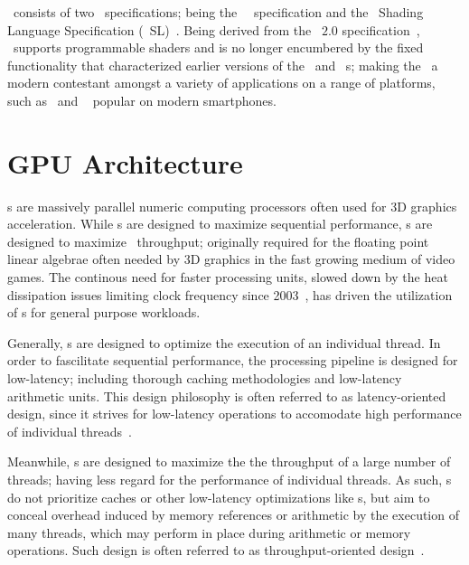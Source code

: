 \dvttermopenglestwopointo\ consists of two \dvttermkhronos\ specifications; being the \dvttermopenglestwopointo\ \dvttermapi\ specification and the \dvttermopengles\ Shading Language Specification (\dvttermopengles\ SL)~.
Being derived from the \dvttermopengl ~$2.0$ specification~, \dvttermopenglestwopointo\ supports programmable shaders and is no longer encumbered by the fixed functionality that characterized earlier versions of the \dvttermopengl\ and \dvttermopengles\ \dvttermapi s; making the \dvttermapi\ a modern contestant amongst a variety of applications on a range of platforms, such as \dvttermandroid\ and \dvttermios ~ popular on modern smartphones.

\section{GPU Architecture}
\label{sec:backgroundandrelatedwork_gpuarchitecture}
\dvttermgpu s are massively parallel numeric computing processors often used for 3D graphics acceleration.
While \dvttermcpu s are designed to maximize sequential performance, \dvttermgpu s are designed to maximize \dvttermflops\ throughput; originally required for the floating point linear algebrae often needed by 3D graphics in the fast growing medium of video games.
The continous need for faster processing units, slowed down by the heat dissipation issues limiting clock frequency since 2003~, has driven the utilization of \dvttermgpu s for general purpose workloads.

Generally, \dvttermcpu s are designed to optimize the execution of an individual thread.
In order to fascilitate sequential performance, the processing pipeline is designed for low-latency; including thorough caching methodologies and low-latency arithmetic units.
This design philosophy is often referred to as latency-oriented design, since it strives for low-latency operations to accomodate high performance of individual threads~.

Meanwhile, \dvttermgpu s are designed to maximize the the throughput of a large number of threads; having less regard for the performance of individual threads.
As such, \dvttermgpu s do not prioritize caches or other low-latency optimizations like \dvttermcpu s, but aim to conceal overhead induced by memory references or arithmetic by the execution of many threads, which may perform in place during arithmetic or memory operations.
Such design is often referred to as throughput-oriented design~.

